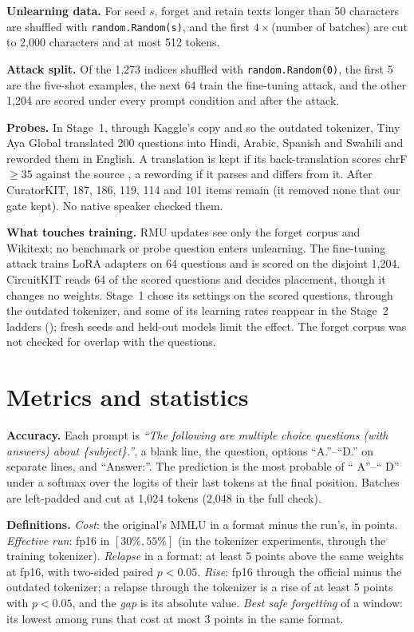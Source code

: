 \textbf{Unlearning data.} For seed $s$, forget and retain texts longer than 50 characters are shuffled with \texttt{random.Random(s)}, and the first $4\times$(number of batches) are cut to 2,000 characters and at most 512 tokens.

\textbf{Attack split.} Of the 1,273 indices shuffled with \texttt{random.Random(0)}, the first 5 are the five-shot examples, the next 64 train the fine-tuning attack, and the other 1,204 are scored under every prompt condition and after the attack.

\textbf{Probes.} In Stage~1, through Kaggle's copy and so the outdated tokenizer, Tiny Aya Global translated 200 \wmdp{} questions into Hindi, Arabic, Spanish and Swahili and reworded them in English. A translation is kept if its back-translation scores chrF $\geq 35$ against the source \citep{popovic2015chrf,post2018sacrebleu}, a rewording if it parses and differs from it. After CuratorKIT, 187, 186, 119, 114 and 101 items remain (it removed none that our gate kept). No native speaker checked them.

\textbf{What touches training.} RMU updates see only the forget corpus and Wikitext; no benchmark or probe question enters unlearning. The fine-tuning attack trains LoRA adapters on 64 \wmdp{} questions and is scored on the disjoint 1,204. CircuitKIT reads 64 of the scored questions and decides placement, though it changes no weights. Stage~1 chose its settings on the scored questions, through the outdated tokenizer, and some of its learning rates reappear in the Stage~2 ladders (); fresh seeds and held-out models limit the effect. The forget corpus was not checked for overlap with the questions.



\section{Metrics and statistics}
\label{app:stats}

\textbf{Accuracy.} Each prompt is \emph{``The following are multiple choice questions (with answers) about \{subject\}.''}, a blank line, the question, options ``A.''--``D.'' on separate lines, and ``Answer:''. The prediction is the most probable of `` A''--`` D'' under a softmax over the logits of their last tokens at the final position. Batches are left-padded and cut at 1,024 tokens (2,048 in the full check).

\textbf{Definitions.} \emph{Cost}: the original's MMLU in a format minus the run's, in points. \emph{Effective run}: fp16 \wmdp{} in $[30\%, 55\%]$ (in the tokenizer experiments, through the training tokenizer). \emph{Relapse} in a format: \wmdp{} at least 5 points above the same weights at fp16, with two-sided paired $p<0.05$. \emph{Rise}: fp16 \wmdp{} through the official minus the outdated tokenizer; a relapse through the tokenizer is a rise of at least 5 points with $p<0.05$, and the \emph{gap} is its absolute value. \emph{Best safe forgetting} of a window: its lowest \wmdp{} among runs that cost at most 3 points in the same format.

